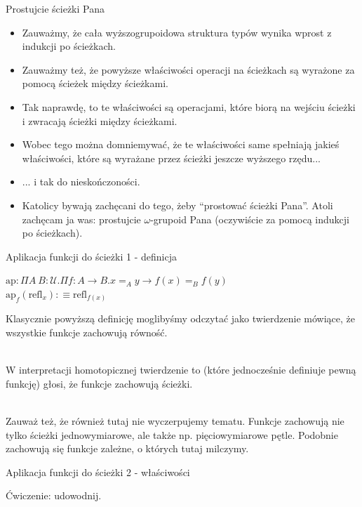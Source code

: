 \documentclass{beamer}
\newcommand{\defn}{:\equiv}
\newcommand{\U}{\mathcal{U}}
\newcommand{\refl}[1]{\text{refl}_{#1}}
\newcommand{\ap}[2]{\text{ap}_{#1}(#2)}
\begin{document}
\begin{frame}{Prostujcie ścieżki Pana}
\begin{itemize}
	\item Zauważmy, że cała wyższogrupoidowa struktura typów wynika wprost z indukcji po ścieżkach.
	\item Zauważmy też, że powyższe właściwości operacji na ścieżkach są wyrażone za pomocą ścieżek między ścieżkami.
	\item Tak naprawdę, to te właściwości są operacjami, które biorą na wejściu ścieżki i zwracają ścieżki między ścieżkami.
	\item Wobec tego można domniemywać, że te właściwości same spełniają jakieś właściwości, które są wyrażane przez ścieżki jeszcze wyższego rzędu...
	\item ... i tak do nieskończoności.
	\item Katolicy bywają zachęcani do tego, żeby ``prostować ścieżki Pana''. Atoli zachęcam ja was: prostujcie $\omega$-grupoid Pana (oczywiście za pomocą indukcji po ścieżkach).
\end{itemize}
\end{frame}

\begin{frame}{Aplikacja funkcji do ścieżki 1 - definicja}

\begin{definition}

$\text{ap} : \Pi A\ B : \U. \Pi f : A \to B. x =_A y \to f(x) =_B f(y)$ \\
$\ap{f}{\refl{x}} \defn \refl{f(x)}$

\end{definition}

Klasycznie powyższą definicję moglibyśmy odczytać jako twierdzenie mówiące, że wszystkie funkcje zachowują równość. \\~\

W interpretacji homotopicznej twierdzenie to (które jednocześnie definiuje pewną funkcję) głosi, że funkcje zachowują ścieżki. \\~\

Zauważ też, że również tutaj nie wyczerpujemy tematu. Funkcje zachowują nie tylko ścieżki jednowymiarowe, ale także np. pięciowymiarowe pętle. Podobnie zachowują się funkcje zależne, o których tutaj milczymy.

\end{frame}

\begin{frame}{Aplikacja funkcji do ścieżki 2 - właściwości}

Ćwiczenie: udowodnij.

\end{frame}
\end{document}
